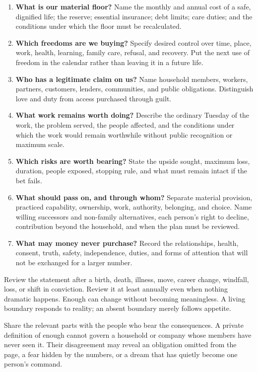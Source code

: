 \begin{enumerate}[itemsep=0.22em]
\item \textbf{What is our material floor?} Name the monthly and annual cost of
  a safe, dignified life; the reserve; essential insurance; debt limits; care
  duties; and the conditions under which the floor must be recalculated.
\item \textbf{Which freedoms are we buying?} Specify desired control over
  time, place, work, health, learning, family care, refusal, and recovery.
  Put the next use of freedom in the calendar rather than leaving it in a
  future life.
\item \textbf{Who has a legitimate claim on us?} Name household members,
  workers, partners, customers, lenders, communities, and public obligations.
  Distinguish love and duty from access purchased through guilt.
\item \textbf{What work remains worth doing?} Describe the ordinary Tuesday
  of the work, the problem served, the people affected, and the conditions
  under which the work would remain worthwhile without public recognition or
  maximum scale.
\item \textbf{Which risks are worth bearing?} State the upside sought, maximum
  loss, duration, people exposed, stopping rule, and what must remain intact if
  the bet fails.
\item \textbf{What should pass on, and through whom?} Separate material
  provision, practiced capability, ownership, work, authority, belonging, and
  choice. Name willing successors and non-family alternatives, each person's
  right to decline, contribution beyond the household, and when the plan must
  be reviewed.
\item \textbf{What may money never purchase?} Record the relationships,
  health, consent, truth, safety, independence, duties, and forms of attention
  that will not be exchanged for a larger number.
\end{enumerate}

Review the statement after a birth, death, illness, move, career change,
windfall, loss, or shift in conviction. Review it at least annually even when
nothing dramatic happens. Enough can change without becoming meaningless. A
living boundary responds to reality; an absent boundary merely follows
appetite.

Share the relevant parts with the people who bear the consequences. A private
definition of enough cannot govern a household or company whose members have
never seen it. Their disagreement may reveal an obligation omitted from the
page, a fear hidden by the numbers, or a dream that has quietly become one
person's command.

